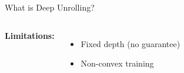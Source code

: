 \begin{frame}{What is Deep Unrolling?}
\begin{columns}[T]
      \vspace{0.3em}
      \textbf{Limitations:}
      \begin{itemize}
        \item Fixed depth (no guarantee)
        \item Non-convex training
      \end{itemize}

      \vspace{0.4em}
  \end{columns}
\end{frame}

